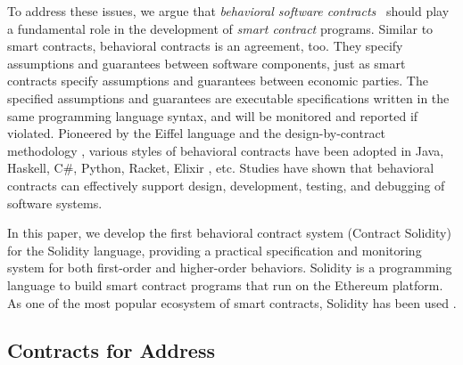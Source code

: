 To address these issues, we argue that \emph{behavioral software
contracts}~\cite{DBLP:conf/tools/Meyer98a} should play a fundamental role in
the development of \emph{smart contract} programs.
Similar to smart contracts, behavioral contracts is an agreement, too. They
specify assumptions and guarantees between software components, just as
smart contracts specify assumptions and guarantees between economic parties.
The specified assumptions and guarantees are executable specifications
written in the same programming language syntax, and will be monitored and
reported if violated.
Pioneered by the Eiffel language \cite{DBLP:books/ph/Meyer91} and the
design-by-contract methodology \cite{DBLP:conf/tools/Meyer98a,
DBLP:books/ph/Meyer97}, various styles of behavioral contracts have been
adopted in Java, Haskell, C\#, Python, Racket, Elixir
\cite{DBLP:conf/erlang/0001BBHMEF22}, etc. 
Studies \cite{DBLP:conf/rodin/Chalin06, DBLP:books/ph/Meyer97}
have shown that behavioral contracts can effectively support design, development,
testing, and debugging of software systems.

In this paper, we develop the first behavioral contract system \lang (Contract
Solidity) for the Solidity language, providing a practical specification and
monitoring system for both first-order and higher-order behaviors.
Solidity is a programming language to build smart contract programs that run on
the Ethereum platform.  As one of the most popular ecosystem of smart
contracts, Solidity has been used .



\subsection*{\textbf{Contracts for Address}}

